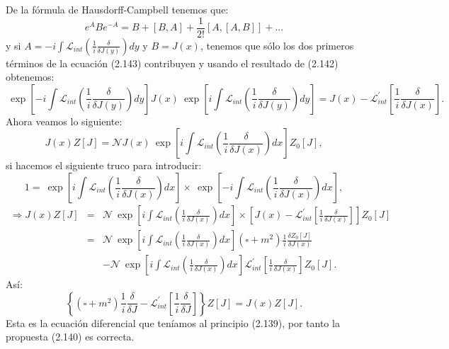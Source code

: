 De la fórmula de Hausdorff-Campbell tenemos que:
\begin{equation}
e^ABe^{-A}=B+[B,A]+\frac{1}{2!}[A,[A,B]]+...
\end{equation}
y si $A=-i\int\mathcal{L}_{int}\left(\frac{1}{i}\frac{\delta}{\delta J(y)}\right)dy$ y $B=J(x)$, tenemos que sólo los dos primeros términos de la ecuación (2.143) contribuyen y usando el resultado de (2.142) obtenemos:
\begin{equation}
\ \exp\left[-i\int\mathcal{L}_{int}\left(\frac{1}{i}\frac{\delta}{\delta J(y)}\right)dy\right]J(x)\ \exp\left[i\int\mathcal{L}_{int}\left(\frac{1}{i}\frac{\delta}{\delta J(y)}\right)dy\right]=J(x)-\mathcal{L}_{int}^{\prime}\left[\frac{1}{i}\frac{\delta}{\delta J(x)}\right].
\end{equation}
Ahora veamos lo siguiente:
\begin{equation}
J(x)Z[J]=\mathcal{N}J(x)\ \exp\left[i\int\mathcal{L}_{int}\left(\frac{1}{i}\frac{\delta}{\delta J(x)}\right)dx\right]Z_{0}[J],
\end{equation}
si hacemos el siguiente truco para introducir:
\begin{equation}
1=\ \exp\left[i\int\mathcal{L}_{int}\left(\frac{1}{i}\frac{\delta}{\delta J(x)}\right)dx\right]\times\ \exp\left[-i\int\mathcal{L}_{int}\left(\frac{1}{i}\frac{\delta}{\delta J(x)}\right)dx\right],
\end{equation}
\begin{eqnarray}
\nonumber \Rightarrow J(x)Z[J]&=&\mathcal{N}\ \exp\left[i\int\mathcal{L}_{int}\left(\frac{1}{i}\frac{\delta}{\delta J(x)}\right)dx\right]\times\left[J(x)-\mathcal{L}_{int}^{\prime}\left[\frac{1}{i}\frac{\delta}{\delta J(x)}\right]\right]Z_{0}[J]\\
\nonumber &=&\mathcal{N}\ \exp\left[i\int\mathcal{L}_{int}\left(\frac{1}{i}\frac{\delta}{\delta J(x)}\right)dx\right](\square+m^{2})\frac{1}{i}\frac{\delta Z_{0}[J]}{\delta J(x)}\\
&&-\mathcal{N}\ \exp\left[i\int\mathcal{L}_{int}\left(\frac{1}{i}\frac{\delta}{\delta J(x)}\right)dx\right]\mathcal{L}_{int}^{\prime}\left[\frac{1}{i}\frac{\delta}{\delta J(x)}\right]Z_{0}[J].
\end{eqnarray}
Así:
\begin{equation}
\left\{ (\square+m^{2})\frac{1}{i}\frac{\delta}{\delta J}-\mathcal{L}_{int}^{\prime}\left[\frac{1}{i}\frac{\delta}{\delta J}\right]\right\} Z[J]=J(x)Z[J].
\end{equation}
Esta es la ecuación diferencial que teníamos al principio (2.139), por tanto la propuesta (2.140) es correcta.
\newpage


